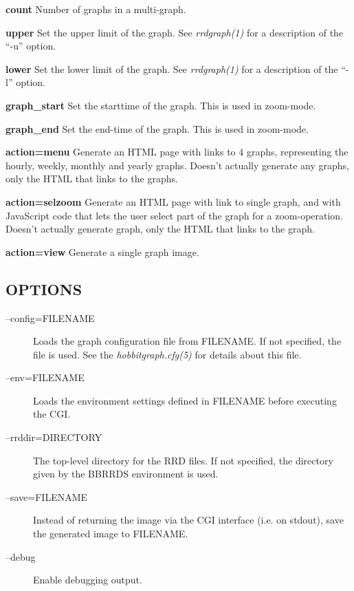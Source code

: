  \textbf{count}
 Number of graphs in a multi-graph. 


 \textbf{upper}
 Set the upper limit of the graph. See \emph{rrdgraph(1)}
 for a description of the ``-u'' option. 


 \textbf{lower}
 Set the lower limit of the graph. See \emph{rrdgraph(1)}
 for a description of the ``-l'' option. 


 \textbf{graph\_start}
 Set the starttime of the graph. This is used in zoom-mode. 


 \textbf{graph\_end}
 Set the end-time of the graph. This is used in zoom-mode. 


 \textbf{action=menu}
 Generate an HTML page with links to 4 graphs, representing the hourly, weekly, monthly and yearly graphs. Doesn't actually generate any graphs, only the HTML that links to the graphs. 


 \textbf{action=selzoom}
 Generate an HTML page with link to single graph, and with JavaScript code that lets the user select part of the graph for a zoom-operation. Doesn't actually generate graph, only the HTML that links to the graph. 


 \textbf{action=view}
 Generate a single graph image. 


 
\subsection{OPTIONS}
\begin{description}
\item[--config=FILENAME] Loads the graph configuration file from FILENAME. If not specified, the file  is used. See the \emph{hobbitgraph.cfg(5)}
 for details about this file. 

 

\item[--env=FILENAME] Loads the environment settings defined in FILENAME before executing the CGI. 

 

\item[--rrddir=DIRECTORY] The top-level directory for the RRD files. If not specified, the directory given by the BBRRDS environment is used. 

 

\item[--save=FILENAME] Instead of returning the image via the CGI interface (i.e. on stdout), save the generated image to FILENAME. 

 

\item[--debug] Enable debugging output. 

 


\end{description}
